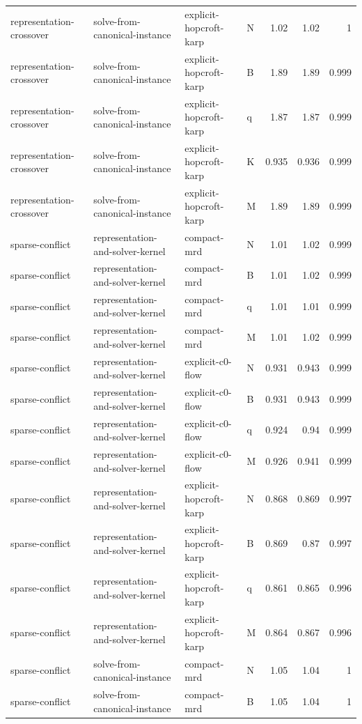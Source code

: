 \begin{table}[t]
\begin{tabular}{llllrrr}
representation-crossover & solve-from-canonical-instance & explicit-hopcroft-karp & N & 1.02 & 1.02 & 1 \\
representation-crossover & solve-from-canonical-instance & explicit-hopcroft-karp & B & 1.89 & 1.89 & 0.999 \\
representation-crossover & solve-from-canonical-instance & explicit-hopcroft-karp & q & 1.87 & 1.87 & 0.999 \\
representation-crossover & solve-from-canonical-instance & explicit-hopcroft-karp & K & 0.935 & 0.936 & 0.999 \\
representation-crossover & solve-from-canonical-instance & explicit-hopcroft-karp & M & 1.89 & 1.89 & 0.999 \\
sparse-conflict & representation-and-solver-kernel & compact-mrd & N & 1.01 & 1.02 & 0.999 \\
sparse-conflict & representation-and-solver-kernel & compact-mrd & B & 1.01 & 1.02 & 0.999 \\
sparse-conflict & representation-and-solver-kernel & compact-mrd & q & 1.01 & 1.01 & 0.999 \\
sparse-conflict & representation-and-solver-kernel & compact-mrd & M & 1.01 & 1.02 & 0.999 \\
sparse-conflict & representation-and-solver-kernel & explicit-c0-flow & N & 0.931 & 0.943 & 0.999 \\
sparse-conflict & representation-and-solver-kernel & explicit-c0-flow & B & 0.931 & 0.943 & 0.999 \\
sparse-conflict & representation-and-solver-kernel & explicit-c0-flow & q & 0.924 & 0.94 & 0.999 \\
sparse-conflict & representation-and-solver-kernel & explicit-c0-flow & M & 0.926 & 0.941 & 0.999 \\
sparse-conflict & representation-and-solver-kernel & explicit-hopcroft-karp & N & 0.868 & 0.869 & 0.997 \\
sparse-conflict & representation-and-solver-kernel & explicit-hopcroft-karp & B & 0.869 & 0.87 & 0.997 \\
sparse-conflict & representation-and-solver-kernel & explicit-hopcroft-karp & q & 0.861 & 0.865 & 0.996 \\
sparse-conflict & representation-and-solver-kernel & explicit-hopcroft-karp & M & 0.864 & 0.867 & 0.996 \\
sparse-conflict & solve-from-canonical-instance & compact-mrd & N & 1.05 & 1.04 & 1 \\
sparse-conflict & solve-from-canonical-instance & compact-mrd & B & 1.05 & 1.04 & 1 \\

\end{tabular}
\end{table}
